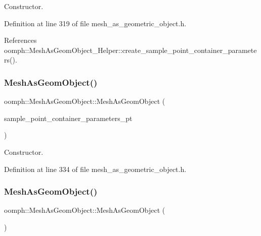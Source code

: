Constructor. 



Definition at line 319 of file mesh\+\_\+as\+\_\+geometric\+\_\+object.\+h.



References oomph\+::\+Mesh\+As\+Geom\+Object\+\_\+\+Helper\+::create\+\_\+sample\+\_\+point\+\_\+container\+\_\+parameters().

\mbox{\label{classoomph_1_1MeshAsGeomObject_a99a84495095584f4715898f436ad897a}} 
\subsubsection{\texorpdfstring{Mesh\+As\+Geom\+Object()}{MeshAsGeomObject()}\hspace{0.1cm}{\footnotesize\ttfamily [2/4]}}
{\footnotesize\ttfamily oomph\+::\+Mesh\+As\+Geom\+Object\+::\+Mesh\+As\+Geom\+Object (\begin{DoxyParamCaption}\item[{\hyperlink{classoomph_1_1SamplePointContainerParameters}{Sample\+Point\+Container\+Parameters} $\ast$}]{sample\+\_\+point\+\_\+container\+\_\+parameters\+\_\+pt }\end{DoxyParamCaption})\hspace{0.3cm}{\ttfamily [inline]}}



Constructor. 



Definition at line 334 of file mesh\+\_\+as\+\_\+geometric\+\_\+object.\+h.

\mbox{\label{classoomph_1_1MeshAsGeomObject_a0488e25a39e03033a3ffff3018295205}} 
\subsubsection{\texorpdfstring{Mesh\+As\+Geom\+Object()}{MeshAsGeomObject()}\hspace{0.1cm}{\footnotesize\ttfamily [3/4]}}
{\footnotesize\ttfamily oomph\+::\+Mesh\+As\+Geom\+Object\+::\+Mesh\+As\+Geom\+Object (\begin{DoxyParamCaption}{ }\end{DoxyParamCaption})\hspace{0.3cm}{\ttfamily [inline]}}



